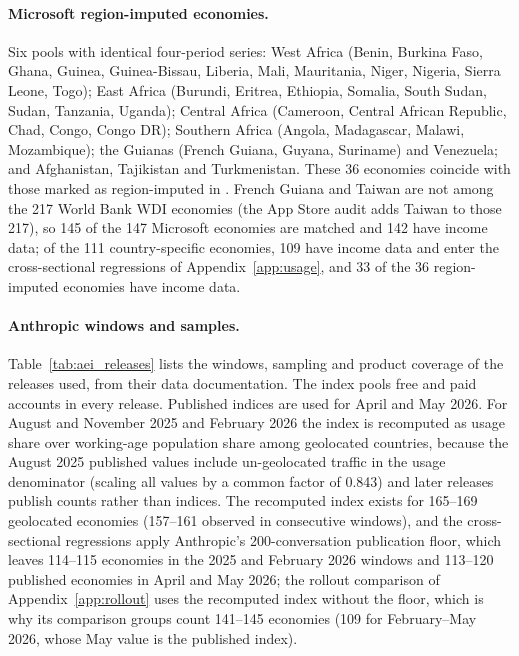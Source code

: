 \documentclass[11pt]{article}
\theoremstyle{definition}
\theoremstyle{remark}
\begin{document}
\paragraph{Microsoft region-imputed economies.} Six pools with identical four-period series: West Africa (Benin, Burkina Faso, Ghana, Guinea, Guinea-Bissau, Liberia, Mali, Mauritania, Niger, Nigeria, Sierra Leone, Togo); East Africa (Burundi, Eritrea, Ethiopia, Somalia, South Sudan, Sudan, Tanzania, Uganda); Central Africa (Cameroon, Central African Republic, Chad, Congo, Congo DR); Southern Africa (Angola, Madagascar, Malawi, Mozambique); the Guianas (French Guiana, Guyana, Suriname) and Venezuela; and Afghanistan, Tajikistan and Turkmenistan. These 36 economies coincide with those marked as region-imputed in \citet[Appendix Table 2]{misra2025measuring}. French Guiana and Taiwan are not among the 217 World Bank WDI economies (the App Store audit adds Taiwan to those 217), so 145 of the 147 Microsoft economies are matched and 142 have income data; of the 111 country-specific economies, 109 have income data and enter the cross-sectional regressions of Appendix~\ref{app:usage}, and 33 of the 36 region-imputed economies have income data.

\paragraph{Anthropic windows and samples.} Table~\ref{tab:aei_releases} lists the windows, sampling and product coverage of the releases used, from their data documentation. The index pools free and paid accounts in every release. Published indices are used for April and May 2026. For August and November 2025 and February 2026 the index is recomputed as usage share over working-age population share among geolocated countries, because the August 2025 published values include un-geolocated traffic in the usage denominator (scaling all values by a common factor of 0.843) and later releases publish counts rather than indices. The recomputed index exists for 165--169 geolocated economies (157--161 observed in consecutive windows), and the cross-sectional regressions apply Anthropic's 200-conversation publication floor, which leaves 114--115 economies in the 2025 and February 2026 windows and 113--120 published economies in April and May 2026; the rollout comparison of Appendix~\ref{app:rollout} uses the recomputed index without the floor, which is why its comparison groups count 141--145 economies (109 for February--May 2026, whose May value is the published index).
\end{document}
